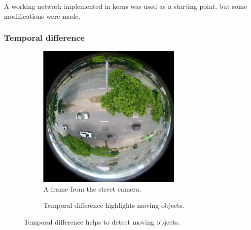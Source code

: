 \documentclass[a4paper,11pt,titlepage,twoside]{article}
\numberwithin{figure}{section}
\begin{document}
A working network implemented in keras\cite{ssd_keras} was used as a starting point, but some modifications were made. 

\subsubsection{Temporal difference}

\begin{figure}
    \begin{subfigure}[Sample1]{0.45\linewidth}
        \includegraphics[width=1\linewidth, height=70mm]{fig/stream_frame.png} 
        \caption{A frame from the street camera.\\ \quad}
        \label{fig:td_frame}
    \end{subfigure}
    \quad
    \begin{subfigure}[Sample1]{0.45\linewidth} 
        \caption{Temporal difference highlights moving objects.}
        \label{fig:td_black}
    \end{subfigure}
    \caption{Temporal difference helps to detect moving objects.}
    \label{fig:td}
\end{figure}
\end{document}
